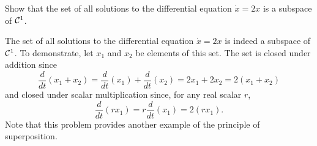 \documentclass{ximera}
\begin{document}
\begin{exercise} \label{c5.1.8}
Show that the set of all solutions to the differential equation
$\dot{x}=2x$ is a subspace of ${\cal C}^1$.

\begin{solution}

The set of all solutions to the differential equation $\dot{x} = 2x$ is
indeed a subspace of ${\cal C}^1$.  To demonstrate, let $x_1$ and $x_2$
be elements of this set.  The set is closed under addition since
\[
\frac{d}{dt}(x_1 + x_2) = \frac{d}{dt}(x_1) + \frac{d}{dt}(x_2)
= 2x_1 + 2x_2 = 2(x_1 + x_2)
\]
and closed under scalar multiplication since, for any real scalar $r$,
\[
\frac{d}{dt}(rx_1) = r\frac{d}{dt}(x_1) = 2(rx_1).
\]
Note that this problem provides another example of the principle of
superposition.

\end{solution}
\end{exercise}
\end{document}
